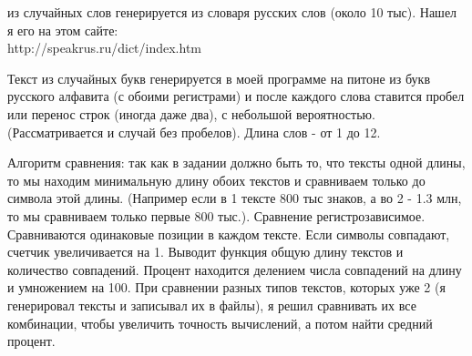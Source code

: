 \documentclass[12pt]{article}
\begin{document}
 из случайных слов генерируется из словаря русских слов (около 10 тыс). Нашел я его на этом сайте:\\
http://speakrus.ru/dict/index.htm\\

\par Текст из случайных букв генерируется в моей программе на питоне из букв русского алфавита (с обоими регистрами) и после каждого слова ставится пробел или перенос строк (иногда даже два), с небольшой вероятностью. (Рассматривается и случай без пробелов). Длина слов - от 1 до 12. 

\par Алгоритм сравнения: так как в задании должно быть то, что тексты одной длины, то мы находим минимальную длину обоих текстов и сравниваем только до символа этой длины. (Например если в 1 тексте 800 тыс знаков, а во 2 - 1.3 млн, то мы сравниваем только первые 800 тыс.). Сравнение регистрозависимое. Сравниваются одинаковые позиции в каждом тексте. Если символы совпадают, счетчик увеличивается на 1. Выводит функция общую длину текстов и количество совпадений. Процент находится делением числа совпадений на длину и умножением на 100. При сравнении разных типов текстов, которых уже 2 (я генерировал тексты и записывал их в файлы), я решил сравнивать их все комбинации, чтобы увеличить точность вычислений, а потом найти средний процент.
\end{document}
